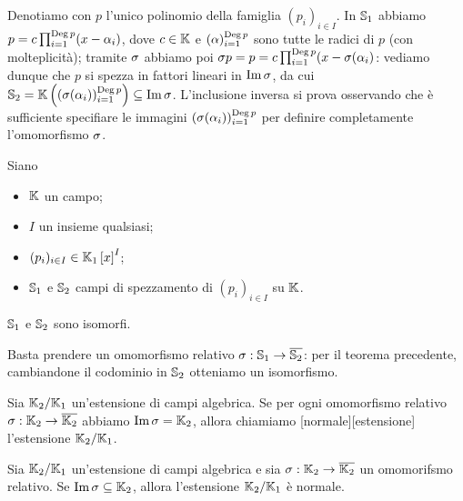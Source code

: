 \par Denotiamo con $p$ l'unico polinomio della famiglia $(p_i)_{i \in I}$. In $\mathbb{S}_1$ abbiamo $p = c \prod_{i = 1}^{\operatorname{Deg}{p}} (x - \alpha_i)$, dove $c \in \mathbb{K}$ e $(\alpha)_{i = 1}^{\operatorname{Deg}{p}}$ sono tutte le radici di $p$ (con molteplicit\`a); tramite $\sigma$ abbiamo poi ${\sigma}{p} = p = c \prod_{i = 1}^{\operatorname{Deg}{p}} (x - \sigma(\alpha_i)$: vediamo dunque che $p$ si spezza in fattori lineari in $\operatorname{Im} \sigma$, da cui $\mathbb{S}_2 = \mathbb{K} \left ( (\sigma(\alpha_i))_{i = 1}^{\operatorname{Deg}{p}} \right ) \subseteq \operatorname{Im} \sigma$. L'inclusione inversa si prova osservando che \`e sufficiente specifiare le immagini $(\sigma(\alpha_i))_{i = 1}^{\operatorname{Deg}{p}}$ per definire completamente l'omomorfismo $\sigma$. \EndProof
\begin{Corollary}
	Siano
	\begin{itemize}
		\item $\mathbb{K}$ un campo;
		\item $I$ un insieme qualsiasi;
		\item $(p_i)_{i \in I} \in \mathbb{K}_1 \left [ x \right ]^I$;
		\item $\mathbb{S}_1$ e $\mathbb{S}_2$ campi di spezzamento di $(p_i)_{i \in I}$ su $\mathbb{K}$.
	\end{itemize}
	$\mathbb{S}_1$ e $\mathbb{S}_2$ sono isomorfi.
\end{Corollary}
\Proof Basta prendere un omomorfismo relativo $\sigma: \mathbb{S}_1 \rightarrow \overline{\mathbb{S}_2}$: per il teorema precedente, cambiandone il codominio in $\mathbb{S}_2$ otteniamo un isomorfismo. \EndProof
\begin{Definition}
	Sia $\mathbb{K}_2/\mathbb{K}_1$ un'estensione di campi algebrica. Se per ogni omomorfismo relativo $\sigma: \mathbb{K}_2 \rightarrow \overline{\mathbb{K}_2}$ abbiamo $\operatorname{Im} \sigma = \mathbb{K}_2$, allora chiamiamo [normale][estensione] l'estensione $\mathbb{K}_2/\mathbb{K}_1$.
\end{Definition}
\begin{Theorem}
	Sia $\mathbb{K}_2/\mathbb{K}_1$ un'estensione di campi algebrica e sia $\sigma: \mathbb{K}_2 \rightarrow \overline{\mathbb{K}_2}$ un omomorifsmo relativo. Se $\operatorname{Im} \sigma \subseteq \mathbb{K}_2$, allora l'estensione $\mathbb{K}_2/\mathbb{K}_1$ \`e normale.
\end{Theorem}
